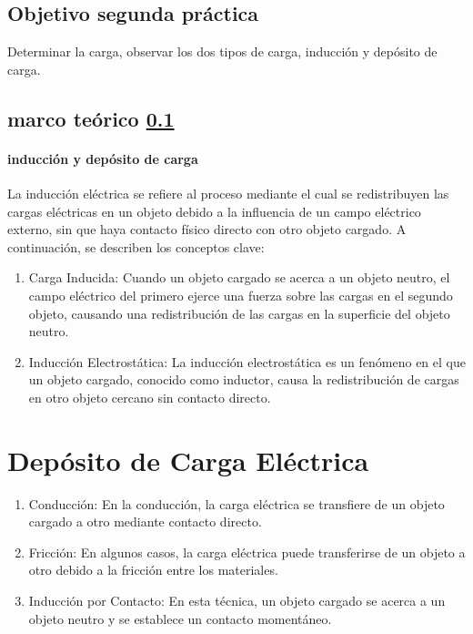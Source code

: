 \documentclass{article}
\begin{document}
\begin{multicols}{2}
\subsection{Objetivo segunda práctica}\label{Objetivo segunda práctica}	
	Determinar la carga, observar los dos tipos de carga, inducción y depósito de carga.
	\subsection{marco teórico \ref{Objetivo segunda práctica}}
	\paragraph*{inducción y depósito de carga}
	La inducción eléctrica se refiere al proceso mediante el cual se redistribuyen
	las cargas eléctricas en un objeto debido a la influencia de un campo eléctrico externo,
	sin que haya contacto físico directo con otro objeto cargado. A continuación, se describen
	los conceptos clave:

	\begin{enumerate}
		\item Carga Inducida: Cuando un objeto cargado se acerca a un objeto neutro, el campo eléctrico del primero ejerce una fuerza sobre las cargas en el segundo objeto, causando una redistribución de las cargas en la superficie del objeto neutro.

\item Inducción Electrostática: La inducción electrostática es un fenómeno en el que un objeto cargado, conocido como inductor, causa la redistribución de cargas en otro objeto cercano sin contacto directo.

\end{enumerate}

\section{Depósito de Carga Eléctrica}

\begin{enumerate}

\item Conducción: En la conducción, la carga eléctrica se transfiere de un objeto cargado a otro mediante contacto directo.

\item Fricción: En algunos casos, la carga eléctrica puede transferirse de un objeto a otro debido a la fricción entre los materiales.

\item Inducción por Contacto: En esta técnica, un objeto cargado se acerca a un objeto neutro y se establece un contacto momentáneo.


\end{enumerate}
\end{multicols}
\end{document}
